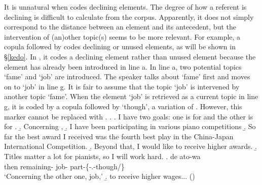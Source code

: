 It is unnatural when  codes declining elements.
The degree of how a referent is declining is difficult to calculate from the corpus.
Apparently, it does not simply correspond to the distance between an element and its antecedent,
but the intervention of (an)other topic(s) seems to be more relevant.
For example,
a copula followed by  codes declining or unused elements, as will be shown in \S \ref{kedo}.
In \Next[g],
it codes a declining element rather than unused element
because the element has already been introduced in line a.
In line a, two potential topics `fame' and `job' are introduced.
The speaker talks about `fame' first and moves on to `job' in line g.
It is fair to assume that the topic `job' is intervened by another topic `fame'.
When the element `job' is retrieved as a current topic in line g,
it is coded by a copula followed by  `though',
a variation of .
However,
this marker cannot be replaced with .
%
\ex.\label{sigoto}
 \a. I have two goals: one is for  and the other is for .
 \b. Concerning ,
 \b. I have been participating in various piano competitions
 \b. So far the best award I received was the fourth best play in the China-Japan International Competition.
 \b. Beyond that, I would like to receive higher awards.
 \b. Titles matter a lot for pianists, so I will work hard.
 \bg. de ato-wa   \\
 	then remaining- job- part-\{-.-though/\} \\
	`Concerning the other one, job,'
 \b. to receive higher wages...
\hfill{()}
%





